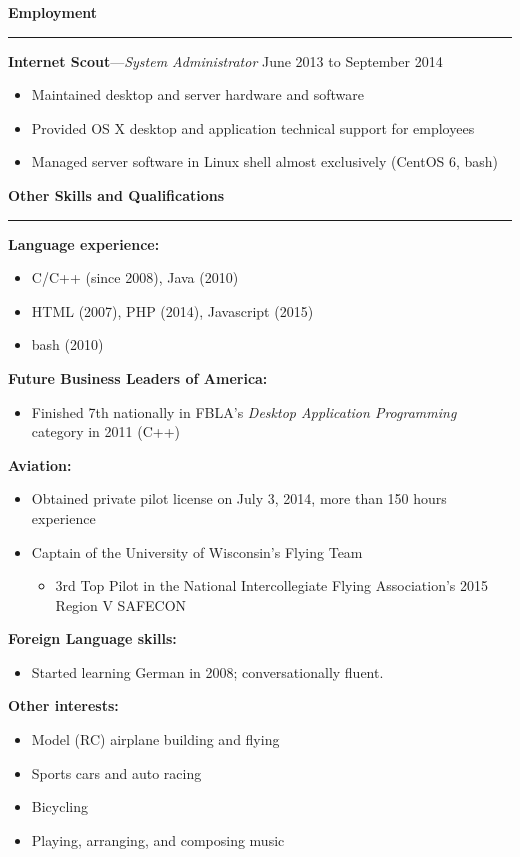 \documentclass[12pt,letterpaper]{article}
\newenvironment{details}{
    \vspace{-.8em}
    \begin{itemize}
        \renewcommand \labelitemi{\labelitemiv}
        \setlength{\itemsep}{0pt}
        \setlength{\parskip}{-1pt}
        \setlength{\parsep}{0pt}
    }{
    \end{itemize}
    \vspace{-.5em}
}
\newcommand{\hr} {
    \vspace{-1em}
    \par\rule{\textwidth}{1pt}
    \vspace{-1.5em}
}
\newcommand{\ressection}[1] {
    \par{\large \textbf{#1}}
    \hr
}
\newenvironment{employment} {
    \setlength{\parskip}{0pt}
    \ressection{Employment}
}{
    \vspace{0.5em}
}
\newenvironment{other} {
    \ressection{Other Skills and Qualifications}
    \setlength{\parskip}{3pt}
}{
    \vspace{0.5em}
}
\newcommand{\employer}[3] {
    \vspace{3pt}
    {\par\textbf{#1}---\textit{#2} \hfill #3}
    \par
}
\begin{document}
\begin{employment}
\employer{Internet Scout}{System Administrator}{June 2013 to September 2014}
\begin{details}
    \item Maintained desktop and server hardware and software
    \item Provided OS X desktop and application technical support for employees
    \item Managed server software in Linux shell almost exclusively (CentOS 6, bash)
\end{details}

\end{employment}

\begin{other}
\par \textbf{Language experience:}
\begin{details}
    \item C/C++ (since 2008), Java (2010)
    \item HTML (2007), PHP (2014), Javascript (2015)
    \item bash (2010)
\end{details}
\par \textbf{Future Business Leaders of America:}
\begin{details}
    \item Finished 7th nationally in FBLA's \textit{Desktop Application Programming} category in 2011 (C++)
\end{details}

\par \textbf{Aviation:}
\begin{details}
    \item Obtained private pilot license on July 3, 2014, more than 150 hours experience
    \item Captain of the University of Wisconsin's Flying Team
    \vspace{.5em}
    \begin{details}
        \item 3rd Top Pilot in the National Intercollegiate Flying Association's 2015 Region V SAFECON
    \end{details}
\end{details}

\par \textbf{Foreign Language skills:}
\begin{details}
    \item Started learning German in 2008; conversationally fluent.
\end{details}

\par \textbf{Other interests:}
\begin{details}
    \item Model (RC) airplane building and flying
    \item Sports cars and auto racing
    \item Bicycling
    \item Playing, arranging, and composing music
\end{details}

\end{other}
\end{document}
